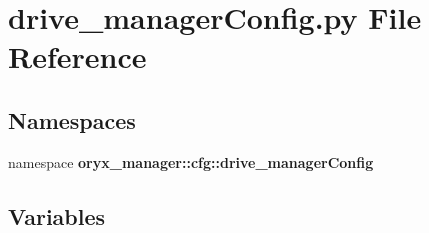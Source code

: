 \section{drive\-\_\-manager\-Config.\-py \-File \-Reference}
\label{drive__managerConfig_8py}
\subsection*{\-Namespaces}
\begin{DoxyCompactItemize}
\item 
namespace {\bf oryx\-\_\-manager\-::cfg\-::drive\-\_\-manager\-Config}
\end{DoxyCompactItemize}
\subsection*{\-Variables}
